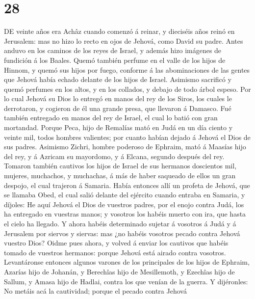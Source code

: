 \hypertarget{section-27}{%
\section{28}\label{section-27}}

 DE veinte años era Achâz cuando comenzó á reinar, y
dieciséis años reinó en Jerusalem: mas no hizo lo recto en ojos de
Jehová, como David su padre.  Antes anduvo en los caminos
de los reyes de Israel, y además hizo imágenes de fundición á los
Baales.  Quemó también perfume en el valle de los hijos de
Hinnom, y quemó sus hijos por fuego, conforme á las abominaciones de las
gentes que Jehová había echado delante de los hijos de Israel.
 Asimismo sacrificó y quemó perfumes en los altos, y en
los collados, y debajo de todo árbol espeso.  Por lo cual
Jehová su Dios lo entregó en manos del rey de los Siros, los cuales le
derrotaron, y cogieron de él una grande presa, que llevaron á Damasco.
Fué también entregado en manos del rey de Israel, el cual lo batió con
gran mortandad.  Porque Peca, hijo de Remalías mató en
Judá en un día ciento y veinte mil, todos hombres valientes; por cuanto
habían dejado á Jehová el Dios de sus padres.  Asimismo
Zichri, hombre poderoso de Ephraim, mató á Maasías hijo del rey, y á
Azricam su mayordomo, y á Elcana, segundo después del rey.
 Tomaron también cautivos los hijos de Israel de sus
hermanos doscientos mil, mujeres, muchachos, y muchachas, á más de haber
saqueado de ellos un gran despojo, el cual trajeron á Samaria.
 Había entonces allí un profeta de Jehová, que se llamaba
Obed, el cual salió delante del ejército cuando entraba en Samaria, y
díjoles: He aquí Jehová el Dios de vuestros padres, por el enojo contra
Judá, los ha entregado en vuestras manos; y vosotros los habéis muerto
con ira, que hasta el cielo ha llegado.  Y ahora habéis
determinado sujetar á vosotros á Judá y á Jerusalem por siervos y
siervas: mas ¿no habéis vosotros pecado contra Jehová vuestro Dios?
 Oidme pues ahora, y volved á enviar los cautivos que
habéis tomado de vuestros hermanos: porque Jehová está airado contra
vosotros.  Levantáronse entonces algunos varones de los
principales de los hijos de Ephraim, Azarías hijo de Johanán, y
Berechîas hijo de Mesillemoth, y Ezechîas hijo de Sallum, y Amasa hijo
de Hadlai, contra los que venían de la guerra.  Y
dijéronles: No metáis acá la cautividad; porque el pecado contra Jehová
